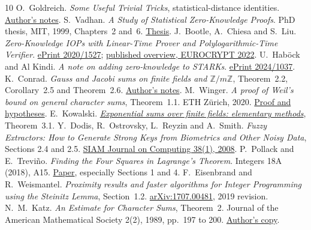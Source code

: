 \begin{thebibliography}{10}
 O.~Goldreich. \emph{Some Useful Trivial Tricks}, statistical-distance identities. \href{https://www.wisdom.weizmann.ac.il/~/oded/tricks.html}{Author's notes}.
 S.~Vadhan. \emph{A Study of Statistical Zero-Knowledge Proofs}. PhD thesis, MIT, 1999, Chapters~2 and~6. \href{https://www.wisdom.weizmann.ac.il/~oded/PSX/salil-phd.pdf}{Thesis}.
 J.~Bootle, A.~Chiesa and S.~Liu. \emph{Zero-Knowledge IOPs with Linear-Time Prover and Polylogarithmic-Time Verifier}. \href{https://eprint.iacr.org/2020/1527}{ePrint 2020/1527}; \href{https://www.iacr.org/archive/eurocrypt2022/132760101/132760101.pdf}{published overview, EUROCRYPT 2022}.
 U.~Hab\"ock and Al Kindi. \emph{A note on adding zero-knowledge to STARKs}. \href{https://eprint.iacr.org/2024/1037}{ePrint 2024/1037}.
 K.~Conrad. \emph{Gauss and Jacobi sums on finite fields and $\mathbb Z/m\mathbb Z$}, Theorem~2.2, Corollary~2.5 and Theorem~2.6. \href{https://kconrad.math.uconn.edu/blurbs/gradnumthy/Gauss-Jacobi-sums.pdf}{Author's notes}.
 M.~Winger. \emph{A proof of Weil's bound on general character sums}, Theorem~1.1. ETH Z\"urich, 2020. \href{https://people.math.ethz.ch/~pinkri/Theses/2020-Bachelor-Moritz-Winger.pdf}{Proof and hypotheses}.
 E.~Kowalski. \href{https://people.math.ethz.ch/~kowalski/exponential-sums-elementary.pdf}{\emph{Exponential sums over finite fields: elementary methods}}, Theorem~3.1.
 Y.~Dodis, R.~Ostrovsky, L.~Reyzin and A.~Smith. \emph{Fuzzy Extractors: How to Generate Strong Keys from Biometrics and Other Noisy Data}, Sections 2.4 and 2.5. \href{https://arxiv.org/abs/cs/0602007}{SIAM Journal on Computing 38(1), 2008}.
 P.~Pollack and E.~Trevi\~no. \emph{Finding the Four Squares in Lagrange's Theorem}. Integers 18A (2018), A15. \href{https://math.colgate.edu/~integers/sjs15/sjs15.pdf}{Paper}, especially Sections 1 and 4.
 F.~Eisenbrand and R.~Weismantel. \emph{Proximity results and faster algorithms for Integer Programming using the Steinitz Lemma}, Section~1.2. \href{https://arxiv.org/abs/1707.00481}{arXiv:1707.00481}, 2019 revision.
 N.~M.~Katz. \emph{An Estimate for Character Sums}, Theorem~2. Journal of the American Mathematical Society 2(2), 1989, pp.~197 to 200. \href{https://web.math.princeton.edu/~nmk/old/estcharsums.pdf}{Author's copy}.
\end{thebibliography}
